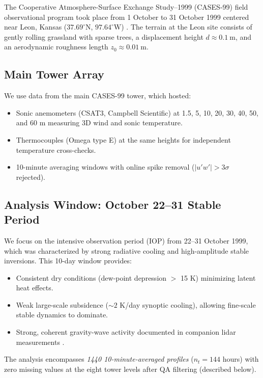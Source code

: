 \documentclass[11pt,a4paper]{article}
\begin{document}
The Cooperative Atmosphere-Surface Exchange Study--1999 (CASES-99) field observational program took place from 1 October to 31 October 1999 centered near Leon, Kansas ($37.69^\circ\text{N}$, $97.64^\circ\text{W}$) \citep{Poulos2002}. The terrain at the Leon site consists of gently rolling grassland with sparse trees, a displacement height $d \approx \SI{0.1}{\meter}$, and an aerodynamic roughness length $z_0 \approx \SI{0.01}{\meter}$.



\subsection{Main Tower Array}

We use data from the main CASES-99 tower, which hosted:
\begin{itemize}
  \item Sonic anemometers (CSAT3, Campbell Scientific) at 1.5, 5, 10, 20, 30, 40, 50, and 60 m measuring 3D wind and sonic temperature.
  \item Thermocouples (Omega type E) at the same heights for independent temperature cross-checks.
  \item 10-minute averaging windows with online spike removal ($|u'w'| > 3 \sigma$ rejected).
\end{itemize}

\subsection{Analysis Window: October 22--31 Stable Period}

We focus on the intensive observation period (IOP) from 22--31 October 1999, which was characterized by strong radiative cooling and high-amplitude stable inversions. This 10-day window provides:
\begin{itemize}
  \item Consistent dry conditions (dew-point depression $>$ 15 K) minimizing latent heat effects.
  \item Weak large-scale subsidence ($\sim 2$ K/day synoptic cooling), allowing fine-scale stable dynamics to dominate.
  \item Strong, coherent gravity-wave activity documented in companion lidar measurements \citep{Poulos2002}. %
\end{itemize}

The analysis encompasses \emph{1440 10-minute-averaged profiles} ($n_t = 144$ hours) with zero missing values at the eight tower levels after QA filtering (described below).
\end{document}

